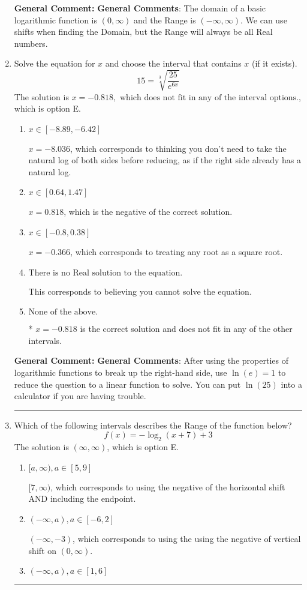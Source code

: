 \documentclass{extbook}[14pt]
\newcommand{\litem}[1]{\item #1

\rule{\textwidth}{0.4pt}}
\begin{document}
\begin{enumerate}
{\textbf{General Comment:} \textbf{General Comments}: The domain of a basic logarithmic function is $(0, \infty)$ and the Range is $(-\infty, \infty)$. We can use shifts when finding the Domain, but the Range will always be all Real numbers.
}
\litem{
 Solve the equation for $x$ and choose the interval that contains $x$ (if it exists).
\[  15 = \sqrt[3]{\frac{25}{e^{6x}}} \]
The solution is \( x = -0.818, \text{ which does not fit in any of the interval options.} \), which is option E.\begin{enumerate}[label=\Alph*.]
\item \( x \in [-8.89, -6.42] \)

$x = -8.036$, which corresponds to thinking you don't need to take the natural log of both sides before reducing, as if the right side already has a natural log.
\item \( x \in [0.64, 1.47] \)

$x = 0.818$, which is the negative of the correct solution.
\item \( x \in [-0.8, 0.38] \)

$x = -0.366$, which corresponds to treating any root as a square root.
\item \( \text{There is no Real solution to the equation.} \)

This corresponds to believing you cannot solve the equation.
\item \( \text{None of the above.} \)

* $x = -0.818$ is the correct solution and does not fit in any of the other intervals.
\end{enumerate}

\textbf{General Comment:} \textbf{General Comments}: After using the properties of logarithmic functions to break up the right-hand side, use $\ln(e) = 1$ to reduce the question to a linear function to solve. You can put $\ln(25)$ into a calculator if you are having trouble.
}
\litem{
Which of the following intervals describes the Range of the function below?
\[ f(x) = -\log_2{(x+7)}+3 \]
The solution is \( (\infty, \infty) \), which is option E.\begin{enumerate}[label=\Alph*.]
\item \( [a, \infty), a \in [5, 9] \)

$[7, \infty)$, which corresponds to using the negative of the horizontal shift AND including the endpoint.
\item \( (-\infty, a), a \in [-6, 2] \)

$(-\infty, -3)$, which corresponds to using the using the negative of vertical shift on $(0, \infty)$.
\item \( (-\infty, a), a \in [1, 6] \)


\end{enumerate}}
\end{enumerate}
\end{document}
